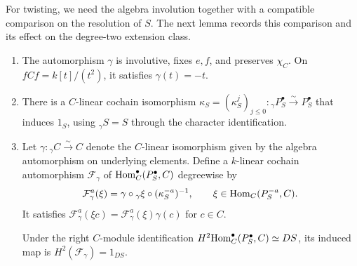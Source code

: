 \documentclass[11pt]{article}
\begin{document}
For twisting, we need the algebra involution together with a compatible
comparison on the resolution of $S$. The next lemma records this
comparison and its effect on the degree-two extension class.

\begin{Lem}\label{seed:gamma}
\leavevmode
\begin{enumerate}
\item\label{seed:gamma-involution} The automorphism $\gamma$ is involutive, fixes $e,f$, and
preserves $\chi_C$. On $fCf=k[t]/(t^2)$, it satisfies $\gamma(t)=-t$.

\item\label{seed:gamma-comparison} There is a $C$-linear cochain isomorphism
$\kappa_S=(\kappa_S^j)_{j\leq 0}: {}_\gamma P_S^\bullet\xrightarrow{\sim}P_S^\bullet$
that induces $1_S$, using ${}_\gamma S=S$ through the character identification.


\item\label{seed:gamma-cohomology} Let $\gamma:{}_\gamma C\xrightarrow{\sim}C$ denote the
$C$-linear isomorphism given by the algebra automorphism on
underlying elements. Define a $k$-linear cochain automorphism
$\mathcal F_\gamma$ of
${\rm Hom}_C^\bullet(P_S^\bullet,C)$ degreewise by
\[
 \mathcal F_\gamma^a(\xi)
   =\gamma\circ{}_\gamma\xi\circ(\kappa_S^{-a})^{-1},
 \qquad \xi\in{\rm Hom}_C(P_S^{-a},C).
\]
It satisfies
$\mathcal F_\gamma^a(\xi c)=\mathcal F_\gamma^a(\xi)\gamma(c)$
for $c\in C$.

Under the right $C$-module identification
$H^2{\rm Hom}_C^\bullet(P_S^\bullet,C)\simeq DS$, its induced map is
$H^2(\mathcal F_\gamma)=1_{DS}$.
\end{enumerate}
\end{Lem}
\end{document}
